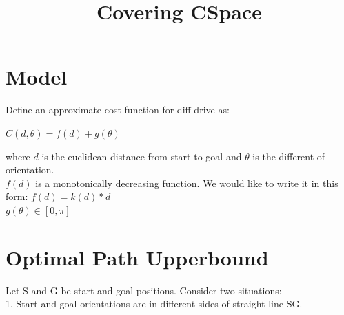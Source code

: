 \documentclass[12pt]{article}
\title{Covering CSpace}
\date{}
\begin{document}
  \maketitle
  
  \section{Model}

    
  
  Define an approximate cost function for diff drive as:

  $C( d, \theta ) = f(d) + g(\theta)$

  where $d$ is the euclidean distance from start to goal and $\theta$ is the different of orientation. \\

  $f(d)$ is a monotonically decreasing function. We would like to write it in this form: $f(d) = k(d) * d$\\

  $g(\theta) \in [0, \pi]$
  
  \section{Optimal Path Upperbound}  
  
  Let S and G be start and goal positions. Consider two situations:\\
  
  1. Start and goal orientations are in different sides of straight line SG.\\
  
\end{document}
